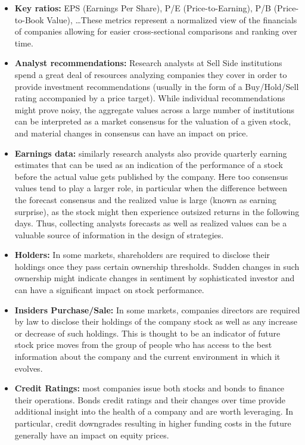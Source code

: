 \begin{itemize}
\item \textbf{Key ratios:} EPS (Earnings Per Share), P/E (Price-to-Earning), P/B (Price-to-Book Value), \dots These metrics represent a normalized view of the financials of companies allowing for easier cross-sectional comparisons and ranking over time.
\item \textbf{Analyst recommendations:} Research analysts at Sell Side institutions spend a great deal of resources analyzing companies they cover in order to provide investment recommendations (usually in the form of a Buy/Hold/Sell rating accompanied by a price target). While individual recommendations might prove noisy, the aggregate values across a large number of institutions can be interpreted as a market consensus for the valuation of a given stock, and material  changes in consensus can have an impact on price.
\item \textbf{Earnings data:} similarly research analysts also provide quarterly earning estimates that can be used as an indication of the performance of a stock before the actual value gets published by the company. Here too consensus values tend to play a larger role, in particular when the difference between the forecast consensus and the realized value is large (known as earning surprise), as the stock might then experience outsized returns in the following days. Thus, collecting analysts forecasts as well as realized values can be a valuable source of information in the design of strategies.
\item \textbf{Holders:}  In some markets, shareholders are required to disclose their holdings once they pass certain ownership thresholds. Sudden changes in such ownership might indicate changes in sentiment by sophisticated investor and can have a significant impact on stock performance.
\item \textbf{Insiders Purchase/Sale:}  In some markets, companies directors are required by law to disclose their holdings of the company stock as well as any increase or decrease of such holdings. This is thought to be an indicator of future stock price moves from the group of people who has access to the best information about the company and the current environment in which it evolves.
\item \textbf{Credit Ratings:} most companies issue both stocks and bonds to finance their operations. Bonds credit ratings and their changes over time provide additional insight into the health of a company and are worth leveraging. In particular, credit downgrades resulting in higher funding costs in the future generally have an impact on equity prices.

\end{itemize}
